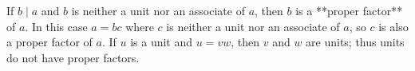 If $b \mid a$ and $b$ is neither a unit nor an associate of $a$, then $b$ is a **proper factor** of $a$. In this case $a = bc$ where $c$ is neither a unit nor an associate of $a$, so $c$ is also a proper factor of $a$. If $u$ is a unit and $u = vw$, then $v$ and $w$ are units; thus units do not have proper factors.
